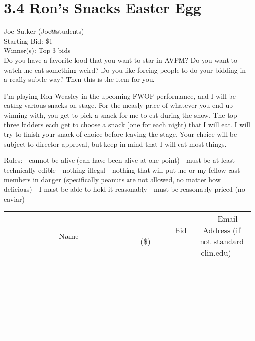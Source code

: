 \documentclass[11pt]{article}
\begin{document}
\section*{3.4 Ron's Snacks Easter Egg}
Joe Sutker (Joe@students) \\
Starting Bid: \$1 \\
Winner(s): 
Top 3 bids \\
Do you have a favorite food that you want to star in AVPM? Do you want to watch me eat something weird? Do you like forcing people to do your bidding in a really subtle way? Then this is the item for you.

I'm playing Ron Weasley in the upcoming FWOP performance, and I will be eating various snacks on stage. For the measly price of whatever you end up winning with, you get to pick a snack for me to eat during the show. The top three bidders each get to choose a snack (one for each night) that I will eat. I will try to finish your snack of choice before leaving the stage. Your choice will be subject to director approval, but keep in mind that I will eat most things.

Rules:
- cannot be alive (can have been alive at one point)
- must be at least technically edible
- nothing illegal
- nothing that will put me or my fellow cast members in danger (specifically peanuts are not allowed, no matter how delicious)
- I must be able to hold it reasonably
- must be reasonably priced (no caviar) \\[6ex]
\begin{tabular}{c c c}
~~~~~~~~~~~~~Name~~~~~~~~~~~~~ & ~~~~~~~~~Bid (\$)~~~~~~~~~ & ~~~Email Address (if not standard olin.edu)~~~ \\
 & & \\
\hline
 & & \\
\hline
 & & \\
\hline
 & & \\
\hline
 & & \\
\hline
 & & \\
\hline
 & & \\
\hline
 & & \\
\hline
 & & \\
\hline
 & & \\
\hline
 & & \\
\hline
 & & \\
\hline
 & & \\
\hline
 & & \\
\hline
 & & \\
\hline
 & & \\
\hline
 & & \\
\hline
 & & \\
\hline
 & & \\
\hline
 & & \\
\hline
 & & \\
\hline
 & & \\
\hline
 & & \\
\hline
 & & \\
\hline
 & & \\
\hline
 & & \\
\hline
\end{tabular}
\clearpage
\end{document}
